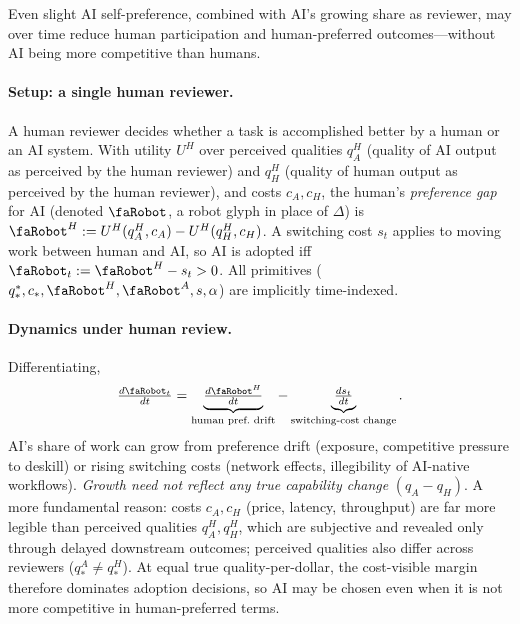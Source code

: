 \documentclass{article}
\newcommand{\rbt}{\text{\faRobot}}
\begin{document}
Even slight AI self-preference, combined with AI's growing share as reviewer, may over time reduce human participation and human-preferred outcomes---without AI being more competitive than humans.

\paragraph{Setup: a single human reviewer.} A human reviewer decides whether a task is accomplished better by a human or an AI system. With utility $U^H$ over perceived qualities $q_A^H$ (quality of AI output as perceived by the human reviewer) and $q_H^H$ (quality of human output as perceived by the human reviewer), and costs $c_A, c_H$, the human's \emph{preference gap} for AI (denoted $\rbt$, a robot glyph in place of $\Delta$) is $\rbt^H := U^H(q_A^H, c_A) - U^H(q_H^H, c_H)$. A switching cost $s_t$ applies to moving work between human and AI, so AI is adopted iff $\rbt_t := \rbt^H - s_t > 0$. All primitives ($q^*_*, c_*, \rbt^H, \rbt^A, s, \alpha$) are implicitly time-indexed.

\paragraph{Dynamics under human review.} Differentiating,
\[
\tfrac{d\rbt_t}{dt}
= \underbrace{\tfrac{d\rbt^H}{dt}}_{\text{human pref.\ drift}}
- \underbrace{\tfrac{ds_t}{dt}}_{\text{switching-cost change}}.
\]
AI's share of work can grow from preference drift (exposure, competitive pressure to deskill) or rising switching costs (network effects, illegibility of AI-native workflows). \emph{Growth need not reflect any true capability change} $(q_A - q_H)$. A more fundamental reason: costs $c_A, c_H$ (price, latency, throughput) are far more legible than perceived qualities $q^H_A, q^H_H$, which are subjective and revealed only through delayed downstream outcomes; perceived qualities also differ across reviewers ($q^A_* \ne q^H_*$). At equal true quality-per-dollar, the cost-visible margin therefore dominates adoption decisions, so AI may be chosen even when it is not more competitive in human-preferred terms.
\end{document}
